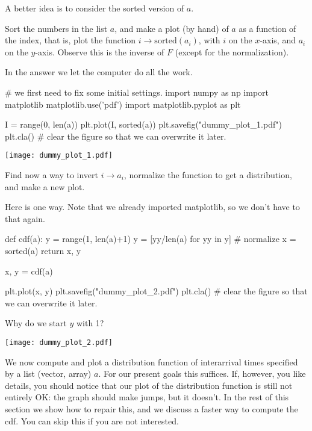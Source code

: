 \documentclass{scrartcl}
\begin{document}
A better idea is to consider the sorted version of $a$. 

\begin{exercise}
  Sort the numbers in the list $a$, and make a plot (by hand) of $a$ as a function of the index, that is, plot the function $i\to \text{sorted}(a_i)$, with $i$ on the $x$-axis, and $a_i$ on the $y$-axis.  Observe this is the inverse of $F$ (except for the normalization).
  \begin{solution}
    In the answer we let the computer do all the work.  

\begin{pyblock}
# we first need to fix some initial settings.
import numpy as np
import matplotlib
matplotlib.use('pdf') 
import matplotlib.pyplot as plt

I = range(0, len(a))
plt.plot(I, sorted(a))
plt.savefig("dummy_plot_1.pdf")
plt.cla() # clear the figure so that we can overwrite it later.
\end{pyblock}

\begin{center}
\texttt{[image: dummy\_plot\_1.pdf]}
\end{center}
  \end{solution}
\end{exercise}

\begin{exercise}
  Find now a way to invert $i\to a_i$, normalize the function to get a distribution, and make a new plot. 
  \begin{solution}
Here is one way. Note that we already imported matplotlib, so we don't have to that again.
\begin{pyblock}
def cdf(a):  
    y = range(1, len(a)+1)
    y = [yy/len(a) for yy in y] # normalize
    x = sorted(a)
    return x, y

x, y = cdf(a)

plt.plot(x, y)
plt.savefig("dummy_plot_2.pdf")
plt.cla() # clear the figure so that we can overwrite it later.
\end{pyblock}
Why do we start $y$ with 1?


\begin{center}
\texttt{[image: dummy\_plot\_2.pdf]}
\end{center}
  \end{solution}
\end{exercise}

We now compute and plot a distribution function of interarrival times specified by a list (vector, array) $a$. For our present goals this suffices. If, however, you like details, you should notice that our plot of the distribution function is still not entirely OK:  the graph should make  jumps, but it doesn't.  In the rest of this section we show how to repair this, and we discuss a faster way to compute the cdf. You can skip this if you are not interested. 
\end{document}

